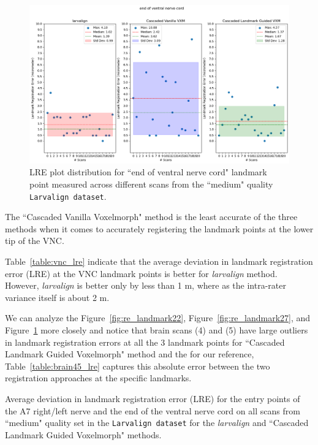 \documentclass{book}
\begin{document}
	\begin{figure}[h!]
		\centering
		\includegraphics[width=0.9\columnwidth]{resources/chapter5_fresh/output/end of ventral nerve cord.png}
		\caption{LRE plot distribution for ``end of ventral nerve cord" landmark point measured across different scans from the ``medium" quality \texttt{Larvalign dataset}.}
		\label{fig:re_landmark15}
	\end{figure}
	
	The ``Cascaded Vanilla Voxelmorph" method is the least accurate of the three methods when it comes to accurately registering the landmark points at the lower tip of the VNC.
	
	Table~\ref{table:vnc_lre} indicate that the average deviation in landmark registration error (LRE) at the VNC landmark points is better for \textit{larvalign} method. However, \emph{larvalign} is better only by less than 1 \textmu m, where as the intra-rater variance itself is about 2 \textmu m.
	
	We can analyze the Figure~\ref{fig:re_landmark22}, Figure~\ref{fig:re_landmark27}, and Figure~\ref{fig:re_landmark15} more closely and notice that brain scans (4) and (5) have large outliers in landmark registration errors at all the 3 landmark points for ``Cascaded Landmark Guided Voxelmorph" method and the for our reference, Table~\ref{table:brain45_lre} captures this absolute error between the two registration approaches at the specific landmarks.
	
	\begin{table}[H]
		\centering
		
		\caption{Average deviation in landmark registration error (LRE) for the entry points of the A7 right/left nerve and the end of the ventral nerve cord on all scans from ``medium" quality set in the \texttt{Larvalign dataset} for the \textit{larvalign} and ``Cascaded Landmark Guided Voxelmorph" methods.}
		\label{table:vnc_lre}
	\end{table}
	
\end{document}

